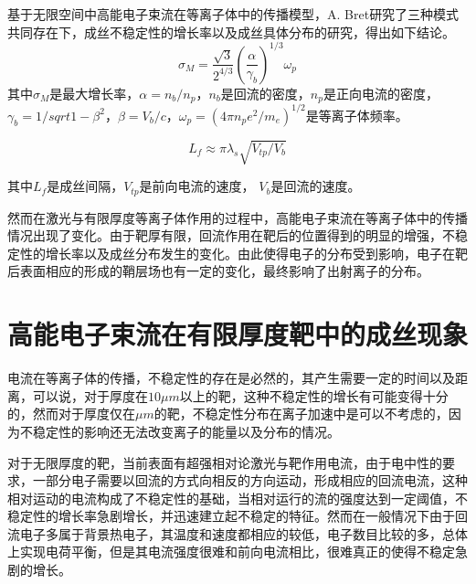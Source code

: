 基于无限空间中高能电子束流在等离子体中的传播模型，A. Bret\cite{bret2005characterization,bret2004collective}研究了三种模式共同存在下，成丝不稳定性的增长率以及成丝具体分布的研究，得出如下结论。
\begin{equation}
\label{eqn:maxGrowth}
{\sigma}_M= \frac{\sqrt{3}}{2^{4/3}}(\frac{\alpha}{{\gamma}_b})^{1/3} {\omega}_p
\end{equation} 
其中${\sigma}_M$是最大增长率，$\alpha=n_b/n_p$，$n_b$是回流的密度，$n_p$是正向电流的密度，${\gamma}_b=1/sqrt{1-{\beta}^2}$，$\beta=V_b/c$，${\omega}_p=(4 \pi n_p e^2/m_e)^{1/2} $是等离子体频率。

\begin{equation}
\label{eqn:filamentSpace}
L_f \approx \pi {\lambda}_s \sqrt{V_{tp}/V_b}
\end{equation} 

其中$L_f$是成丝间隔，$V_{tp}$是前向电流的速度， $V_b$是回流的速度。


然而在激光与有限厚度等离子体作用的过程中，高能电子束流在等离子体中的传播情况出现了变化。由于靶厚有限，回流作用在靶后的位置得到的明显的增强，不稳定性的增长率以及成丝分布发生的变化。由此使得电子的分布受到影响，电子在靶后表面相应的形成的鞘层场也有一定的变化，最终影响了出射离子的分布。


\section{高能电子束流在有限厚度靶中的成丝现象}



电流在等离子体的传播，不稳定性的存在是必然的，其产生需要一定的时间以及距离，可以说，对于厚度在$10\mu m$以上的靶，这种不稳定性的增长有可能变得十分的，然而对于厚度仅在$\mu m$的靶，不稳定性分布在离子加速中是可以不考虑的，因为不稳定性的影响还无法改变离子的能量以及分布的情况。


对于无限厚度的靶，当前表面有超强相对论激光与靶作用电流，由于电中性的要求，一部分电子需要以回流的方式向相反的方向运动，形成相应的回流电流，这种相对运动的电流构成了不稳定性的基础，当相对运行的流的强度达到一定阈值，不稳定性的增长率急剧增长，并迅速建立起不稳定的特征。然而在一般情况下由于回流电子多属于背景热电子，其温度和速度都相应的较低，电子数目比较的多，总体上实现电荷平衡，但是其电流强度很难和前向电流相比，很难真正的使得不稳定急剧的增长。






